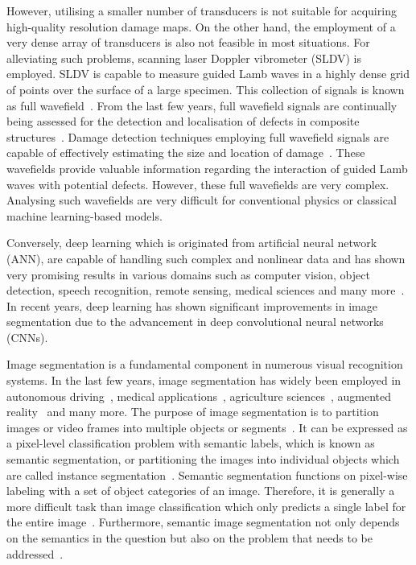 However, utilising a smaller number of transducers is not suitable for acquiring high-quality resolution damage maps.
On the other hand, the employment of a very dense array of transducers is also not feasible in most situations. 
For alleviating such problems, scanning laser Doppler vibrometer (SLDV) is employed. 
SLDV is capable to measure guided Lamb waves in a highly dense grid of points over the surface of a large specimen.
This collection of signals is known as full wavefield~\cite{radzienski2019damage}. 
From the last few years, full wavefield signals are continually being assessed for the detection and localisation of defects in composite
structures~\cite{radzienski2019damage, girolamo2018impact, kudela2018impact, sohn2011delamination, sohn2011automated, rogge2013characterization}.
Damage detection techniques employing full wavefield signals are capable of effectively estimating the size and location of damage~\cite{girolamo2018impact, kudela2018impact}.
These wavefields provide valuable information regarding the interaction of guided Lamb waves with potential defects.  
However, these full wavefields are very complex. 
Analysing such wavefields are very difficult for conventional physics or classical machine learning-based models. 
 
Conversely, deep learning which is originated from artificial neural network (ANN), are capable of handling such complex and nonlinear data and has shown very promising results in various domains such as computer vision, object detection, speech recognition, remote sensing, medical sciences
and many more~\cite{deng2014deep, mohanty2016using, zhang2020well, pashaei2020review}.
In recent years, deep learning has shown significant improvements in image segmentation due to the advancement in deep convolutional neural networks (CNNs).

Image segmentation is a fundamental component in numerous visual recognition
systems. In the last few years, image segmentation has widely been
employed in autonomous driving~\cite{zhang2013understanding, cordts2016cityscapes, ros2016synthia, li2018real}, medical applications~\cite{taghanaki2021deep}, agriculture sciences~\cite{milioto2018real}, augmented reality~\cite{miksik2015semantic} and many more. 
The purpose of image segmentation is to partition images or video frames into multiple objects or segments~\cite{szeliski2010computer}.
It can be expressed as a pixel-level classification problem with semantic labels, which is known as semantic segmentation, or partitioning the images into individual objects which are called instance segmentation~\cite{szeliski2010computer, minaee2021image}. 
Semantic segmentation functions on pixel-wise labeling with a set of object categories of an image. 
Therefore, it is generally a more difficult task than image classification which only predicts a single label for the entire image~\cite{szeliski2010computer, minaee2021image}.
Furthermore, semantic image segmentation not only depends on the semantics in
the question but also on the problem that needs to be addressed~\cite{ghosh2019understanding}.

